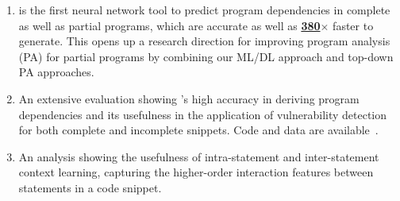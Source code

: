 \begin{enumerate}

\item {\tool} is the first neural network tool to predict program
  dependencies in complete as well as partial programs, which are
  accurate as well as {\bf \underline{380$\times$}} faster to generate. This
  opens up a research direction for improving program analysis (PA)
  for partial programs by combining our ML/DL approach and top-down PA
  approaches.

\item An extensive evaluation showing {\tool}'s high accuracy in
  deriving program dependencies and its usefulness in the application
  of vulnerability detection for both complete and incomplete
  snippets. Code and data are available~\cite{deeppda}.


    \item An analysis showing the usefulness of intra-statement and
      inter-statement context learning, capturing the
      higher-order interaction features between statements in a code
      snippet.
\end{enumerate}

